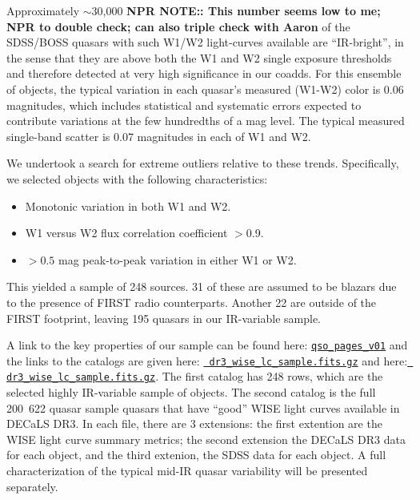 \documentclass[11pt,a4paper]{article}
\begin{document}
Approximately $\sim$30,000 {\bf NPR NOTE:: This number seems low to
me; NPR to double check; can also triple check with Aaron} of the
SDSS/BOSS quasars with such W1/W2 light-curves available are
``IR-bright'', in the sense that they are above both the W1 and W2
single exposure thresholds and therefore detected at very high
significance in our coadds. For this ensemble of objects, the typical
variation in each quasar's measured (W1-W2) color is 0.06 magnitudes,
which includes statistical and systematic errors expected to
contribute variations at the few hundredths of a mag level. The
typical measured single-band scatter is 0.07 magnitudes in each of W1
and W2.

We undertook a search for extreme outliers relative to these trends.
Specifically, we selected objects with the following characteristics:
\begin{itemize}
    \item Monotonic variation in both W1 and W2.
    \item W1 versus W2 flux correlation coefficient $>$0.9.
    \item $>0.5$ mag peak-to-peak variation in either W1 or W2.
\end{itemize}
This yielded a sample of 248 sources. 31 of these are assumed to be
blazars due to the presence of FIRST radio counterparts. Another 22
are outside of the FIRST footprint, leaving 195 quasars in our
IR-variable sample.

A link to the key properties of our sample can be found here:
\href{http://portal.nersc.gov/project/cosmo/temp/ameisner/qso\_pages\_v01/}
{\tt qso\_pages\_v01} and the links to the catalogs are given here:
\href{http://portal.nersc.gov/project/cosmo/temp/ameisner/dr3_wise_lc_sample.fits.gz}{{\tt
dr3\_wise\_lc\_sample.fits.gz}} and here:
\href{http://portal.nersc.gov/project/cosmo/temp/ameisner/dr3_wise_lc_metrics_all_qso.fits.gz}{{\tt
dr3\_wise\_lc\_sample.fits.gz}}.  The first catalog has 248 rows,
which are the selected highly IR-variable sample of objects.  The
second catalog is the full \hbox{200 622} quasar sample quasars that
have ``good'' WISE light curves available in DECaLS DR3. In each file,
there are 3 extensions: the first extention are the WISE light curve
summary metrics; the second extension the DECaLS DR3 data for each
object, and the third extenion, the SDSS data for each object.
A full characterization of the typical mid-IR quasar variability will be
presented separately.
\end{document}
